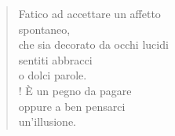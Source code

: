 
\begin{verse}
    Fatico ad accettare un affetto\\
    spontaneo,\\
    che sia decorato da occhi lucidi\\
    sentiti abbracci\\
    o dolci parole.\\!
    È un pegno da pagare\\
    oppure a ben pensarci\\
    un'illusione.    
\end{verse}